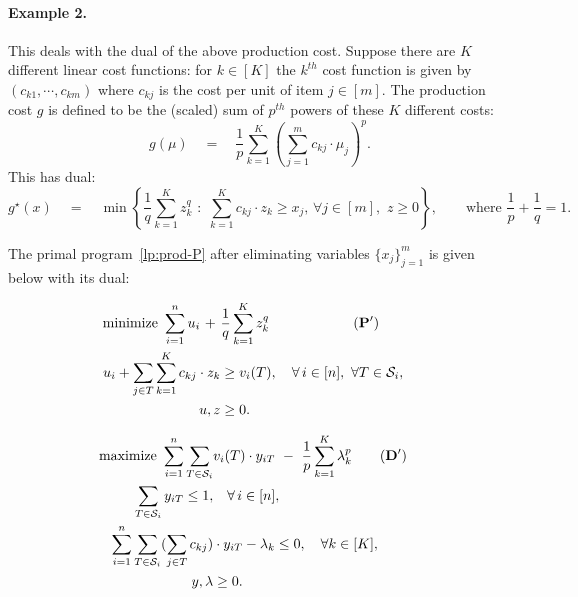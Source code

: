 \documentclass[letterpaper,11pt]{article}
\def\cS{\mathcal{S}}
\begin{document}
\paragraph{Example 2.} This deals with the dual of the above production cost. Suppose there are $K$ different  linear  cost functions: for $k\in [K]$ the $k^{th}$ cost function is given by $(c_{k1},\cdots,c_{km})$ where $c_{kj}$ is the cost per unit of item $j\in[m]$. The production cost $g$ is defined to be the (scaled) sum of $p^{th}$ powers of these $K$ different costs:
\begin{equation}\label{eq:prod-cost-eg2} g (\mu) \quad =\quad \frac{1}{p}\sum_{k=1}^K \left(\sum_{j=1}^m c_{kj}\cdot \mu_j\right)^p.
\end{equation}
This has dual:
$$g^\star(x) \quad =\quad \min \left\{ \frac{1}{q}\sum_{k=1}^K z_k^q\,\, :\,\, \sum_{k=1}^K c_{kj}\cdot z_k \ge x_j,\, \forall j\in[m],\,\, z\ge 0\right\}, \qquad \mbox{where }\frac{1}{p}+\frac1q=1.$$

The primal program~\eqref{lp:prod-P} after eliminating variables $\{x_j\}_{j=1}^m$ is given below with its dual:

\begin{minipage}[t]{0.5\textwidth}
{\small \begin{alignat}{2}
  \mbox{minimize } \sum_{i=1}^{n} \ou_i \,\,+\,\, & \frac1q \sum_{k=1}^K z_k^q  \qquad \qquad \qquad \mathbf{(P')}
  \notag & \\ \ou_i + \sum_{j\in T} \sum_{k=1}^K c_{kj}\cdot z_k & \ge v_i(T),\quad  \forall \,
  i \in [n], \,\,\forall T\in \cS_i,  & \notag \\
  \ou,z &\geq 0. & \notag
\end{alignat}}
\end{minipage}
\begin{minipage}[t]{0.5\textwidth}
{\small \begin{alignat}{2}
  \mbox{maximize } \sum_{i=1}^{n} \sum_{T\in \cS_i} &v_i(T)\cdot y_{iT}  \,\,-\,\, \frac1p \sum_{k=1}^K \lambda_k^p   \qquad \mathbf{(D')} \notag &\\
  \sum_{T\in \cS_i} y_{iT}  \le 1,   & \quad \forall \, i \in [n],   \notag \\
\sum_{i=1}^n \sum_{T\in \cS_i} (\sum_{j\in T} c_{kj} ) & \cdot y_{iT} - \lambda_k  \le 0, \quad  \forall k\in [K],  \notag  \\
  y,\lambda &\geq 0. \notag
\end{alignat}}
\end{minipage}
\end{document}
